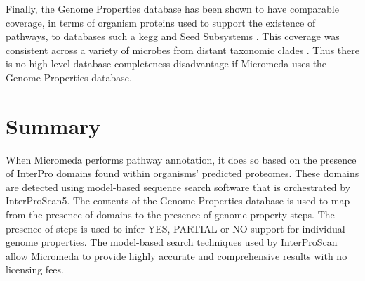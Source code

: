 Finally, the Genome Properties database has been shown to have comparable coverage, in terms of organism proteins used to support the existence of pathways, to databases such a \gls{kegg} and Seed Subsystems \cite{richardson2018genome}. This coverage was consistent across a variety of microbes from distant taxonomic clades \cite{richardson2018genome}. Thus there is no high-level database completeness disadvantage if Micromeda uses the Genome Properties database. 

\section{Summary}

When Micromeda performs pathway annotation, it does so based on the presence of InterPro domains found within organisms' predicted proteomes. These domains are detected using model-based sequence search software that is orchestrated by InterProScan5. The contents of the Genome Properties database is used to map from the presence of domains to the presence of genome property steps. The presence of steps is used to infer YES, PARTIAL or NO support for individual genome properties. The model-based search techniques used by InterProScan allow Micromeda to provide highly accurate and comprehensive results with no licensing fees.
